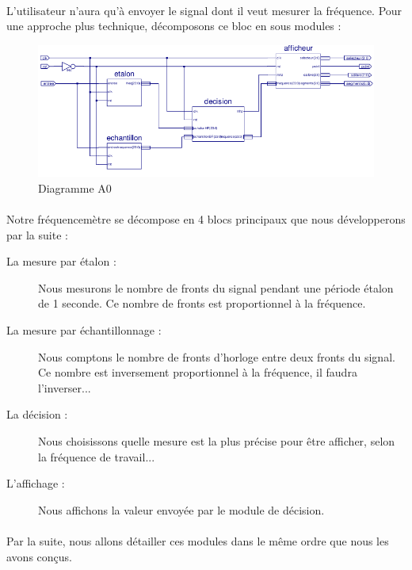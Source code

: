 \documentclass[a4paper,11pt]{article}
\begin{document}
\paragraph{} L'utilisateur n'aura qu'à envoyer le signal dont il veut mesurer la fréquence. Pour une approche plus technique, décomposons
ce bloc en sous modules :

\begin{figure}[H]
\begin{center}
	\includegraphics[scale=.9]{sch-frequencemetre.png}
	\caption{Diagramme A0}
\end{center}
\end{figure}

\paragraph{} Notre fréquencemètre se décompose en 4 blocs principaux que nous développerons par la suite : 
\begin{description}
  \item[La mesure par étalon : ] Nous mesurons le nombre de fronts du signal pendant une période étalon de 1 seconde. Ce nombre de fronts est
  proportionnel à la fréquence.
  \item[La mesure par échantillonnage : ] Nous comptons le nombre de fronts d'horloge entre deux fronts du signal. Ce nombre est
  inversement proportionnel à la fréquence, il faudra l'inverser...
  \item[La décision : ] Nous choisissons quelle mesure est la plus précise pour être afficher, selon la fréquence de travail...
  \item[L'affichage : ] Nous affichons la valeur envoyée par le module de décision.
\end{description}

\paragraph{} Par la suite, nous allons détailler ces modules dans le même ordre que nous les avons conçus.
\end{document}
